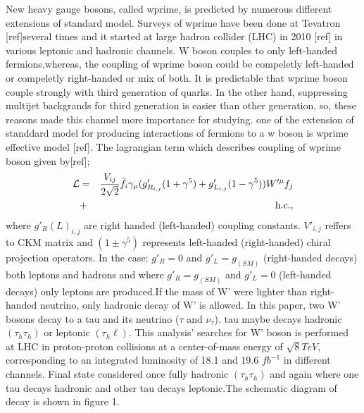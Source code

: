 New heavy gauge bosons, called wprime, is predicted by numerous different extensions of standard model. Surveys of wprime have been done at Tevatron [ref]several times and it started at large hadron collider (LHC) in 2010 [ref] in various leptonic and hadronic channels. W boson couples to only left-handed fermions,whereas, the coupling of wprime boson could be compeletly left-handed or compeletly right-handed or mix of both. It is predictable that wprime boson couple strongly with third generation of quarks. In the other hand, suppressing multijet backgrands for third generation is easier than other generation, so, these reasons made this channel more importance for studying.
one of the extension of standdard model for producing interactions of fermions to a w boson is wprime effective model [ref]. The lagrangian term which describes coupling of wprime boson given by[ref];
\begin{eqnarray}
{\cal L}& =& \frac{V_{ij}}{2\sqrt{2}}\bar{f_i} \gamma_{\mu}(g^\prime_{R_{i,j}} (1+{\gamma}^5)+
g^\prime_{L_{i,j}}
(1-{\gamma}^5)) W^{\prime \mu} f_j  \nonumber\\
&+& \mathrm{h.c.},
\end{eqnarray}
where $g'_R(L)_{i,j}$ are right handed (left-handed) coupling constants. $V'_{i,j}$ reffers to CKM matrix and $(1\pm{\gamma^5})$ represents left-handed (right-handed) chiral projection operators. In the case: $g'_R = 0$ and $g'_L = g_{(SM)}$ (right-handed decays) both leptons and hadrons and where $g'_R = g_{(SM)}$ and $g'_L = 0$ (left-handed decays) only leptons are produced.If the mass of W' were lighter than right-handed neutrino, only hadronic decay of W' is allowed.
In this paper, two W' bosons decay to a tau and its neutrino ($\tau$ and $\nu_{\tau}$). tau maybe decays hadronic $(\tau_h  \tau_h)$ or leptonic $(\tau_h \ell)$. This analysis' searches for W' boson is performed at LHC in proton-proton collisions at a center-of-mass energy of $\sqrt{8}TeV$, corresponding to an integrated luminosity of 18.1 and 19.6 $fb^{-1}$ in different channels. Final state considered once fully hadronic $(\tau_h \tau_h)$ and again where one tau decays hadronic and other tau decays leptonic.The schematic diagram of decay is shown in figure 1.